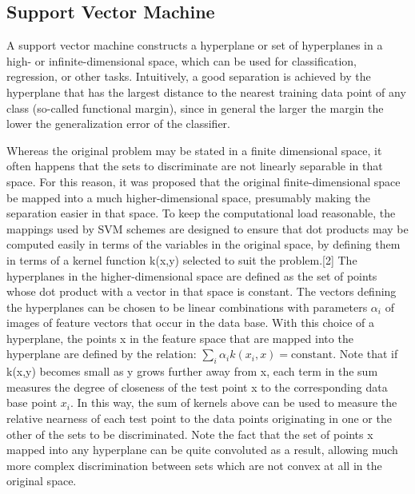 \documentclass[12pt]{book}
\begin{document}

\subsection{Support Vector Machine}
A support vector machine constructs a hyperplane or set of hyperplanes in a high- or infinite-dimensional space, which can 
be used for classification, regression, or other tasks. Intuitively, a good separation is achieved 
by the hyperplane that has the largest distance to the nearest training data point of any class (so-called functional margin), 
since in general the larger the margin the lower the generalization error of the classifier.

Whereas the original problem may be stated in a finite dimensional space, it often happens that the sets to discriminate are not linearly 
separable in that space. For this reason, it was proposed that the original finite-dimensional space be mapped into a much higher-dimensional 
space, presumably making the separation easier in that space. To keep the computational load reasonable, the mappings used by SVM schemes 
are designed to ensure that dot products may be computed easily in terms of the variables in the original space, by defining them in terms of 
a kernel function k(x,y) selected to suit the problem.[2] The hyperplanes in the higher-dimensional space are defined as the set of points whose dot 
product with a vector in that space is constant. The vectors defining the hyperplanes can be chosen to be linear combinations with parameters $\alpha_i$ 
of images of feature vectors that occur in the data base. With this choice of a hyperplane, the points x in the feature space that are mapped into the hyperplane are defined by the relation: 
$\textstyle\sum_i \alpha_i k(x_i,x) = \mathrm{constant}$. Note that if k(x,y) becomes small as y grows further away from x, each term in the sum 
measures the degree of closeness of the test point x to the corresponding data base point $x_i$. In this way, the sum of kernels above can be used to measure the relative
nearness of each test point to the data points originating in one or the other of the sets to be discriminated. Note the fact that the set of points x mapped into any hyperplane 
can be quite convoluted as a result, allowing much more complex discrimination between sets which are not convex at all in the original space.
\end{document}
